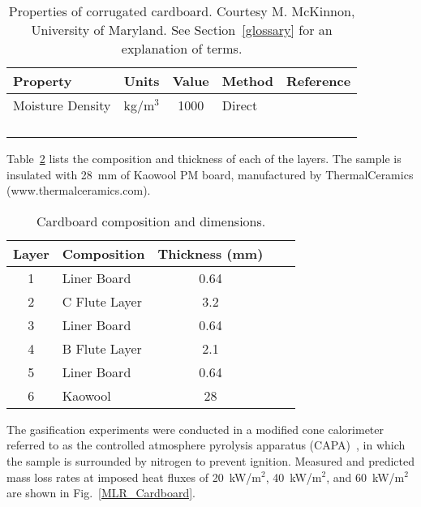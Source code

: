 \begin{table}[h!]
\caption[Properties of corrugated cardboard.]{Properties of corrugated cardboard. Courtesy M. McKinnon, University of Maryland. See Section~\ref{glossary} for an explanation of terms.}
\begin{center}
\begin{tabular}{|l|c|c|l|l|}
\hline
Property                &      Units    &      Value                        & Method                                    & Reference                     \\ \hline \hline
Moisture Density        &     kg/m$^3$  & 1000                              & Direct                                    & \cite{Kempel:1}               \\ \hline
& & & & \\ \hline
& & & & \\ \hline
& & & & \\ \hline
& & & & \\ \hline
\end{tabular}
\end{center}
\label{Properties_Cardboard}
\end{table}
Table~\ref{Dimensions_Cardboard} lists the composition and thickness of each of the layers. The sample is insulated with 28~mm of Kaowool PM board, manufactured by ThermalCeramics (www.thermalceramics.com).
\begin{table}[h!]
\caption[Cardboard composition and dimensions]{Cardboard composition and dimensions.}
\begin{center}
\begin{tabular}{|c|l|c|l|l|}
\hline
Layer	  & Composition   & Thickness (mm) \\ \hline \hline
1	      & Liner Board	  & 0.64       \\ \hline
2	      & C Flute Layer & 3.2        \\ \hline
3	      & Liner Board	  & 0.64       \\ \hline
4	      & B Flute Layer & 2.1        \\ \hline
5	      & Liner Board	  & 0.64       \\ \hline
6	      & Kaowool	      & 28         \\ \hline
\end{tabular}
\end{center}
\label{Dimensions_Cardboard}
\end{table}
The gasification experiments were conducted in a modified cone calorimeter referred to as the controlled atmosphere pyrolysis apparatus (CAPA)~\cite{Semmes:IAFSS11}, in which the sample is surrounded by nitrogen to prevent ignition. Measured and predicted mass loss rates at imposed heat fluxes of 20~kW/m$^2$, 40~kW/m$^2$, and 60~kW/m$^2$ are shown in Fig.~\ref{MLR_Cardboard}.

